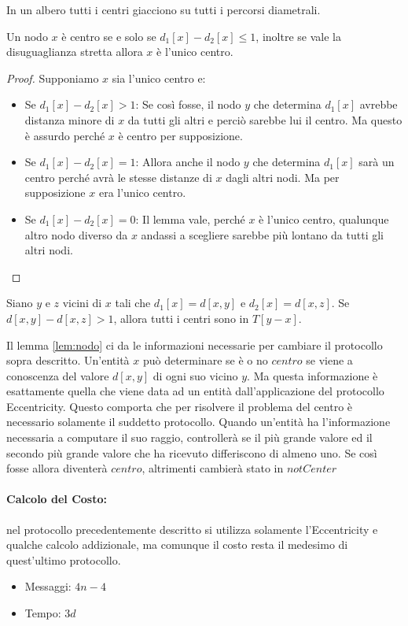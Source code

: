 \begin{lemma}
    In un albero tutti i centri giacciono su tutti i percorsi diametrali.
\end{lemma}

\begin{lemma}\label{lem:nodo}
    Un nodo $x$ è centro se e solo se $d_1[x]-d_2[x]\leq 1$, inoltre
    se vale la disuguaglianza stretta allora $x$ è l'unico centro.
\end{lemma}

\begin{proof}
    Supponiamo $x$ sia l'unico centro e:
    \begin{itemize}
        \item Se $d_1[x]-d_2[x] > 1$: Se così fosse, il nodo $y$ che determina
              $d_1[x]$ avrebbe distanza minore di $x$ da tutti gli altri e perciò sarebbe
              lui il centro. Ma questo è assurdo perché $x$ è centro per supposizione.
        \item Se $d_1[x]-d_2[x] = 1$: Allora anche il nodo $y$ che determina $d_1[x]$
              sarà un centro perché avrà le stesse distanze di $x$ dagli altri nodi. Ma per
              supposizione $x$ era l'unico centro.
        \item Se $d_1[x]-d_2[x] = 0$: Il lemma vale, perché $x$ è l'unico centro,
              qualunque altro nodo diverso da $x$ andassi a scegliere sarebbe più lontano da
              tutti gli altri nodi.
    \end{itemize}
\end{proof}

\begin{lemma}
    Siano $y$ e $z$ vicini di $x$ tali che $d_1[x] = d[x, y]$ e $d_2 [x] = d[x,
                z]$. Se $d[x, y] - d[x, z] > 1$, allora tutti i centri sono in $T [y - x]$.
\end{lemma}

Il lemma \ref{lem:nodo} ci da le informazioni necessarie per cambiare il protocollo sopra
descritto. Un'entità $x$ può determinare se è o no $centro$ se viene a
conoscenza del valore $d[x,y]$ di ogni suo vicino $y$. Ma questa informazione è
esattamente quella che viene data ad un entità dall'applicazione del protocollo
Eccentricity. Questo comporta che per risolvere il problema del centro è
necessario solamente il suddetto protocollo. Quando un'entità ha l'informazione
necessaria a computare il suo raggio, controllerà se il più grande valore ed il
secondo più grande valore che ha ricevuto differiscono di almeno uno. Se così
fosse allora diventerà $centro$, altrimenti cambierà stato in $notCenter$

\paragraph{Calcolo del Costo:}
nel protocollo precedentemente descritto si utilizza solamente l'Eccentricity e
qualche calcolo addizionale, ma comunque il costo resta il medesimo di
quest'ultimo protocollo.
\begin{itemize}
    \item Messaggi: $4n - 4$
    \item Tempo: $3d$
\end{itemize}

